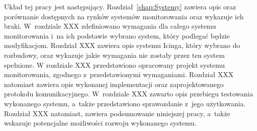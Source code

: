 Układ tej pracy jest następujący. Rozdział~\ref{chap:Systemy}
zawiera opis oraz porównanie dostępnych na rynków systemów
monitorowania oraz wykazuje ich braki. W~rozdziale XXX zdefiniowano
wymagania dla całego systemu monitorowania i~na ich podstawie wybrano
system, który podlegać będzie modyfikacjom. Rozdział XXX zawiera opis
systemu Icinga, który wybrano do rozbudowy, oraz wykazuje jakie
wymagania nie zostały przez ten system spełnione. W rozdziale XXX
przedstawiono opracowany projekt systemu monitorowania, zgodnego
z~przedstawionymi wymaganiami. Rozdział XXX natomiast zawiera opis
wykonanej implementacji oraz zaprojektowanego protokołu
komunikacyjnego. W~rozdziale XXX zawarto opis przebiegu testowania
wykonanego systemu, a~także przedstawiono sprawozdanie z~jego
użytkowania. Rozdział XXX natomiast, zawiera podsumowanie niniejszej
pracy, a~także wskazuje potencjalne możliwości rozwoju wykonanego
systemu.
